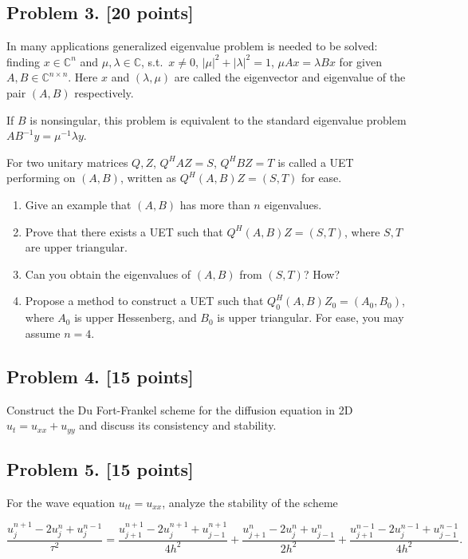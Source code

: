 \documentclass[11pt,a4paper]{article}
\begin{document}


\subsection{Problem 3. [20 points]}
In many applications generalized eigenvalue problem is needed to be solved: finding \(x \in \mathbb{C}^{n}\) and \(\mu, \lambda \in \mathbb{C}\), s.t.\ \(x \neq 0\), \(|\mu|^{2} + |\lambda|^{2} = 1\), \(\mu A x = \lambda B x\) for given \(A, B \in \mathbb{C}^{n \times n}\). Here \(x\) and \((\lambda, \mu)\) are called the eigenvector and eigenvalue of the pair \((A, B)\) respectively.

If \(B\) is nonsingular, this problem is equivalent to the standard eigenvalue problem \(A B^{-1} y = \mu^{-1} \lambda y\).

For two unitary matrices \(Q, Z\), \(Q^{H} A Z = S\), \(Q^{H} B Z = T\) is called a UET performing on \((A, B)\), written as \(Q^{H}(A, B)Z = (S, T)\) for ease.
\begin{enumerate}[label=(\alph*)]
    \item Give an example that \((A, B)\) has more than \(n\) eigenvalues.
    \item Prove that there exists a UET such that \(Q^{H}(A, B)Z = (S, T)\), where \(S, T\) are upper triangular.
    \item Can you obtain the eigenvalues of \((A, B)\) from \((S, T)\)? How?
    \item Propose a method to construct a UET such that \(Q_{0}^{H}(A, B)Z_{0} = (A_{0}, B_{0})\), where \(A_{0}\) is upper Hessenberg, and \(B_{0}\) is upper triangular. For ease, you may assume \(n = 4\).
\end{enumerate}

\subsection{Problem 4. [15 points]}
Construct the Du Fort-Frankel scheme for the diffusion equation in 2D \(u_{t} = u_{xx} + u_{yy}\) and discuss its consistency and stability.



\subsection{Problem 5. [15 points]}
For the wave equation \(u_{tt} = u_{xx}\), analyze the stability of the scheme

\[
\frac{u_{j}^{n+1} - 2u_{j}^{n} + u_{j}^{n-1}}{\tau^{2}}
=
\frac{u_{j+1}^{n+1} - 2u_{j}^{n+1} + u_{j-1}^{n+1}}{4h^{2}}
+
\frac{u_{j+1}^{n} - 2u_{j}^{n} + u_{j-1}^{n}}{2h^{2}}
+
\frac{u_{j+1}^{n-1} - 2u_{j}^{n-1} + u_{j-1}^{n-1}}{4h^{2}}.
\]
\end{document}

